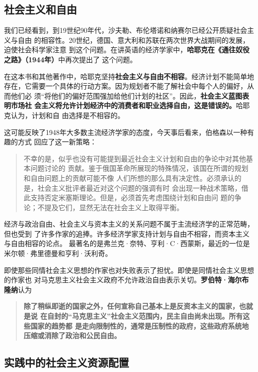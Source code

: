 \subsection{社会主义和自由}

我们已经看到，到19世纪90年代，沙夫勒、布伦塔诺和纳赛尔已经公开质疑社会主义与自由
的相容性。20世纪，德国、意大利和苏联在两次世界大战期间的发展，迫使社会科学家注意
到这个问题。在讲英语的经济学家中，\textbf{哈耶克在《通往奴役之路》（1944年）}中再次提出了
这个问题。

在这本书和其他著作中，哈耶克坚持\textbf{社会主义与自由不相容}。经济计划不能简单地
存在，它需要一个具体的行动方案。因为规划者不能了解社会中每个人的偏好，从而他们必
须“将他们的偏好范围强加给他们计划的社区”。因此，\textbf{社会主义蓝图表明市场社
  会主义将允许计划经济中的消费者和职业选择自由，这是错误的。}哈耶克认为，计划和自
由选择是不相容的。

这可能反映了1948年大多数主流经济学家的态度，今天事后看来，伯格森以一种有趣的方式
回应了这一新策略：

\begin{quotation}
  不幸的是，似乎也没有可能提到最近社会主义计划和自由的争论中对其他基本问题讨论的
  贡献。鉴于俄国革命所展现的特殊情况，该国在所谓的规划和自由问题上的贡献可能不像
  人们所想的那么具有决定性。必须承认的是，社会主义批评者最近对这个问题的强调有时
  会出现一种战术策略，借此支持否定米塞斯理论。但是，必须首先考虑围绕计划和自由问
  题的争论；不提及它们，显然无法在社会主义上取得平衡。
\end{quotation}

经济与政治自由、社会主义与资本主义的关系问题不属于主流经济学的正常范畴，但也受到
了许多作家的追捧。许多经济学家支持计划与自由不相容，而资本主义与自由相容的论点。
最著名的是弗兰克·奈特、亨利·C·西蒙斯，最近的一位是米尔顿·弗里德曼和亨利·沃利奇。

即使那些同情社会主义思想的作家也对失败表示了担忧。即使是同情社会主义思想的作家也
对马克思主义社会主义政府不允许政治自由表示关切。\textbf{罗伯特·海尔布隆纳}认为
\begin{quotation}
  \textbf{除了稍纵即逝的国家之外，任何宣称自己基本上是反资本主义的国家，也就是说
    在自封的“马克思主义”社会主义范围内，民主自由尚未出现。所有这些国家的趋势都
    是走向限制性的，通常是压制性的政府，这些政府系统地压缩或消除了政治和公民自由。}
\end{quotation}

\raggedbottom
\clearpage
\subsection{实践中的社会主义资源配置}

